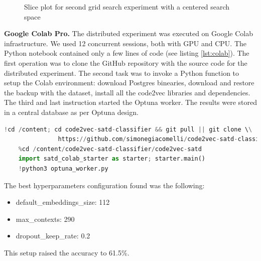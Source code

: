 \begin{figure}
 \centering
 \caption[]{Slice plot for second grid search experiment with a centered search space}
    \label{fig:optuna_second}
\end{figure}



\textbf{Google Colab Pro.} The distributed experiment was executed on Google Colab infrastructure. We used 12 concurrent sessions, both with GPU and CPU. The Python notebook contained only a few lines of code (see listing \ref{lst:colab}). The first operation was to clone the GitHub repository with the source code for the distributed experiment. The second task was to invoke a Python function to setup the Colab environment: download Postgres binearies, download and restore the backup with the dataset, install all the code2vec libraries and dependencies. The third and last instruction started the Optuna worker. The results were stored in a central database as per Optuna design.

\begin{lstlisting}[caption={Example code to show decomposition}, label={lst:snippet_ast_code},language=Python]
    !cd /content; cd code2vec-satd-classifier && git pull || git clone \\
               https://github.com/simonegiacomelli/code2vec-satd-classifier
    %cd /content/code2vec-satd-classifier/code2vec-satd
    import satd_colab_starter as starter; starter.main()
    !python3 optuna_worker.py

\end{lstlisting}


\noindent The best hyperparameters configuration found was the following:
\begin{itemize}
    \item default\_embeddings\_size: 112
    \item max\_contexts: 290
    \item dropout\_keep\_rate: 0.2
\end{itemize}
This setup raised the accuracy to 61.5\%.

